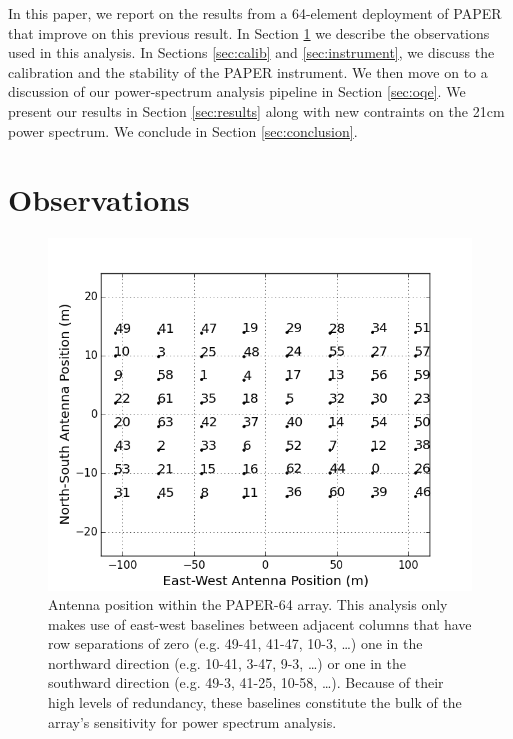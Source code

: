 \documentclass[twocolumn,numberedappendix]{emulateapj} \shorttitle{PSA64}
\begin{document}
In this paper, we report on the results from a 64-element deployment of PAPER
that improve on this previous result.  In Section
\ref{sec:observations} we describe the observations used in this analysis. In
Sections \ref{sec:calib} and \ref{sec:instrument}, 
we discuss the calibration and 
the stability of the PAPER instrument.
We then move on to a discussion of our power-spectrum analysis pipeline in Section
\ref{sec:oqe}. 
We present our results in Section
\ref{sec:results} along with new contraints on the 21cm power spectrum.
We conclude in Section \ref{sec:conclusion}.



\section{Observations}\label{sec:observations}

\begin{figure}[!t]\centering
\includegraphics[width=\columnwidth]{plots/antenna_positions.png}
\caption{
Antenna position within the PAPER-64 array.
This analysis only makes use of
east-west baselines between adjacent columns that have row
separations of zero (e.g. 49-41, 41-47, 10-3, \dots)
one in the northward direction (e.g. 10-41, 3-47, 9-3, \dots) or
one in the southward direction (e.g. 49-3, 41-25, 10-58, \dots).
Because of their high levels of redundancy, 
these baselines constitute the bulk of the array's sensitivity for power
spectrum analysis.}
\label{fig:antenna_positions}
\end{figure}
\end{document}
